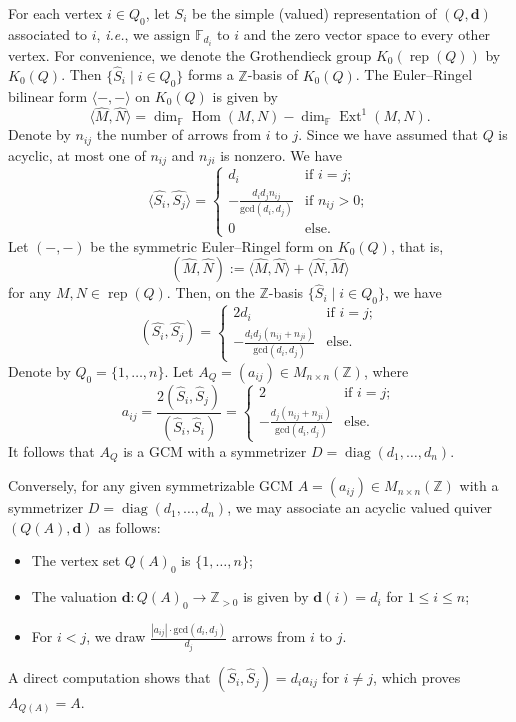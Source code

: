 \documentclass[12pt,reqno]{amsart}
\numberwithin{equation}{section}
\newcommand{\ie}{{\em i.e.}}
\newcommand{\rep}{\operatorname{rep}\nolimits}
\newcommand{\Ext}{\operatorname{Ext}\nolimits}
\newcommand{\Hom}{\operatorname{Hom}\nolimits}
\renewcommand{\dim}{\operatorname{dim}\nolimits}
\newcommand{\go}{{K_0}}
\def \gcd{\mathrm{gcd}}
\begin{document}
	For each vertex $i\in Q_0$, let $S_i$ be the simple (valued) representation of $(Q,\mathbf{d})$ associated to $i$, \ie, we assign $\mathbb{F}_{d_i}$ to $i$ and the zero vector space  to every other vertex. For convenience, we denote the Grothendieck group $\go(\rep(Q))$ by $\go(Q)$. Then $\{\hat{S}_i\mid i\in Q_0\}$ forms a $\mathbb{Z}$-basis of $\go(Q)$. The Euler--Ringel bilinear form $\langle-,-\rangle$ on $\go(Q)$ is given by 
	\[
	\langle \hat{M},\hat{N}\rangle =\dim_{\mathbb{F}}\Hom(M,N)-\dim_{\mathbb{F}}\Ext^1(M,N).
	\]
	Denote by $n_{ij}$ the number of arrows from $i$ to $j$. Since we have assumed that $Q$ is acyclic, at most one of $n_{ij}$ and $n_{ji}$ is nonzero.
	We have
	\[
	\langle \hat{S_i},\hat{S_j}\rangle=\begin{cases}
		d_i &\text{if $i=j$};\\
		-\frac{d_id_jn_{ij}}{\gcd(d_i,d_j)}&\text{if  $n_{ij}>0$};\\
		0 &\text{else}.
	\end{cases}
	\]
	Let $(-,-)$ be the symmetric Euler--Ringel form on $\go(Q)$, that is, \[(\hat{M},\hat{N}):=\langle \hat{M},\hat{N}\rangle+\langle \hat{N},\hat{M}\rangle\] for any $M,N\in \rep(Q)$. Then, on the $\mathbb{Z}$-basis $\{\hat{S}_i\mid i\in Q_0\}$, we have
	\[
	( \hat{S_i},\hat{S_j})=\begin{cases}
		2d_i &\text{if $i=j$};\\
		-\frac{d_id_j(n_{ij}+n_{ji})}{\gcd{(d_i,d_j)}} &\text{else}.
	\end{cases}
	\]
	Denote by $Q_0=\{1,\ldots,n\}$. 
	Let $A_Q=(a_{ij})\in M_{n\times n}(\mathbb{Z})$, where
	\begin{equation}\label{eq:gcm-valued-quiver}
		a_{ij}=\frac{2(\hat{S}_i,\hat{S}_j)}{(\hat{S}_i,\hat{S}_i)}=\begin{cases}
			2&\text{if $i=j$};\\
			-\frac{d_j(n_{ij}+n_{ji})}{\gcd(d_i,d_j)}&\text{else}.
		\end{cases}
	\end{equation}
	It follows that $A_Q$ is a GCM with a symmetrizer $D=\operatorname{diag}(d_1,\ldots, d_n)$.
	
	Conversely, for any given symmetrizable GCM $A=(a_{ij})\in M_{n\times n}(\mathbb{Z})$ with a symmetrizer $D=\operatorname{diag}(d_1,\ldots, d_n)$, we may associate an acyclic valued quiver $(Q(A),\mathbf{d})$ as follows:
	\begin{itemize}
		\item The vertex set $Q(A)_0$ is $\{1,\ldots, n\}$;
		\item The valuation $\mathbf{d}:Q(A)_0\rightarrow \mathbb{Z}_{>0}$ is given by $\mathbf{d}(i)=d_i$ for $1\leq i\leq n$;
		\item For $i<j$, we draw $\frac{|a_{ij}|\cdot\gcd(d_i,d_j)}{d_j}$ arrows from $i$ to $j$.
	\end{itemize}
	A direct computation shows that $(\hat{S}_i,\hat{S}_j)=d_ia_{ij}$ for $i\neq j$, which proves $A_{Q(A)}=A$.
	
\end{document}
